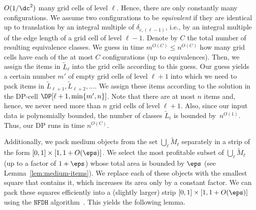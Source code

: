 {$O(1/\dc^2)$ many grid cells of level $\ell$. Hence, there are only constantly
many configurations.
We assume two configurations to be \emph{equivalent} if they are identical up to translation by an integral multiple of $\delta_{c,(\ell-1)}$, i.e., by an integral multiple of the edge length of a grid cell of level $\ell-1$.
Denote by $C$ the total number of resulting equivalence classes.
We guess in time $m^{O(C)}\le n^{O(C)}$ how many grid cells
have each of the at most $C$ configurations (up to equivalences). Then, we assign the
items in $\tilde{L}_{\ell}$ into the grid cells according to this guess.
Our guess
yields a certain number $m'$ of empty grid cells of level $\ell+1$
into which we need to pack items in $\tilde{L}_{\ell+1},\tilde{L}_{\ell+2},\dots$.
We assign these items according to the solution in the DP-cell $\DP[\ell+1,\min\{m',n\}]$.
Note that there are at most $n$ items and, hence, we never need more
than $n$ grid cells of level $\ell+1$. Also, since our input data is
polynomially bounded, the number of classes $\tilde{L}_{i}$ is bounded
by~$n^{O(1)}$. Thus, our DP runs in time $n^{O(C)}$.

Additionally, we pack medium objects from the set $\bigcup_{\ell}\tilde{M}_{\ell}$
separately in a strip of the form $[0,1]\times[1,1+O(\eps)]$. We select the most profitable subset of $\bigcup_{\ell}\tilde{M}_{\ell}$
(up to a factor of $1+\eps$) whose total area is bounded by $\eps$
(see Lemma~\ref{lem:medium-items}).
We replace each
of these objects with the smallest square that contains it, which
increases its area only by a constant factor.
We can pack these squares efficiently into a (slightly larger) strip $[0,1]\times[1,1+O(\eps)]$ using the $\mathtt{NFDH}$ algorithm~\cite{NFDH}. This yields the following lemma.

}
